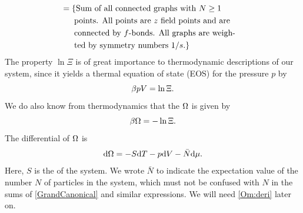\documentclass[8.5pt,twoside,twocolumn]{article}
\newcommand\di{\te{d}}
\theoremstyle{standard}
\begin{document}
\begin{equation}
\begin{aligned}
\\
&=\left\{\text{Sum of all connected graphs with } N \ge 1 \right. \\
&\left.\ \ \ \text{ points. All points are } z \text{ field points and are}\right. \\
&\left.\ \ \ \ \text{connected by }f\text{-bonds. All graphs are weigh-}\right. \\
&\left.\ \ \ \ \text{ted by symmetry numbers 1/} s. \right\}
\end{aligned}
\label{Grand:log}
\end{equation}  
The property $\ln \Xi$ is of great importance to thermodynamic descriptions of our system,
since it yields a thermal equation of state (EOS) for the pressure $p$ by
\begin{equation}
\beta p V = \ln \Xi.
\label{bpV}
\end{equation}
We do also know from thermodynamics that the 
$\Omega$ is given by
\begin{equation}
\beta \Omega = - \ln \Xi.
\label{Om:lnXi}
\end{equation}
The differential of $\Omega$ is
\begin{equation}
\di\Om = -S \di T - p \di V - \bar N \di \mu.
\label{Om:deri}
\end{equation}
Here, $S$ is the  of the system. We wrote $\bar N$ to indicate the
expectation value of the number $N$ of particles in the system, which must not
be confused with $N$ in the sums of \eqref{GrandCanonical} and similar expressions.
We will need \eqref{Om:deri} later on.
\end{document}
